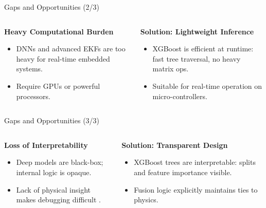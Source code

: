 \documentclass[aspectratio=169,xcolor=dvipsnames]{beamer}
\begin{document}
\begin{frame}{Gaps and Opportunities (2/3)}
\begin{columns}[T]
    \begin{column}{0.48\textwidth}
    \begin{block}{{\textbf{Heavy Computational Burden}}}
    \begin{itemize}
        \item DNNs\cite{golroudbari2023cnn6DOF}\cite{CEAS-GNC-2019-036}\cite{brossard2020openloopCNN} and advanced EKFs\cite{EKF}\cite{doubleEKF} are too heavy for real-time embedded systems.
        \item Require GPUs or powerful processors\cite{chen2024dlsurvey}.
    \end{itemize}
    \end{block}
    \end{column}
    
    \begin{column}{0.48\textwidth}
    \begin{exampleblock}{{\textbf{Solution: Lightweight Inference}}}
    \begin{itemize}
        \item XGBoost is efficient at runtime: fast tree traversal, no heavy matrix ops.
        \item Suitable for real-time operation on micro-controllers.
    \end{itemize}
    \end{exampleblock}
    \end{column}
\end{columns}
\end{frame}

\begin{frame}{Gaps and Opportunities (3/3)}
\scriptsize
\begin{columns}[T]
    \begin{column}{0.48\textwidth}
    \begin{block}{{\textbf{Loss of Interpretability}}}
    \begin{itemize}
        \item Deep models\cite{golroudbari2023cnn6DOF}\cite{CEAS-GNC-2019-036}\cite{brossard2020openloopCNN} are black-box; internal logic is opaque.
        \item Lack of physical insight makes debugging difficult \cite{chen2024dlsurvey}.
    \end{itemize}
    \end{block}
    \end{column}
    
    \begin{column}{0.48\textwidth}
    \begin{exampleblock}{{\textbf{Solution: Transparent Design}}}
    \begin{itemize}
        \item XGBoost trees are interpretable: splits and feature importance visible.
        \item Fusion logic explicitly maintains ties to physics.
    \end{itemize}
    \end{exampleblock}
    \end{column}
\end{columns}
\end{frame}
\end{document}
